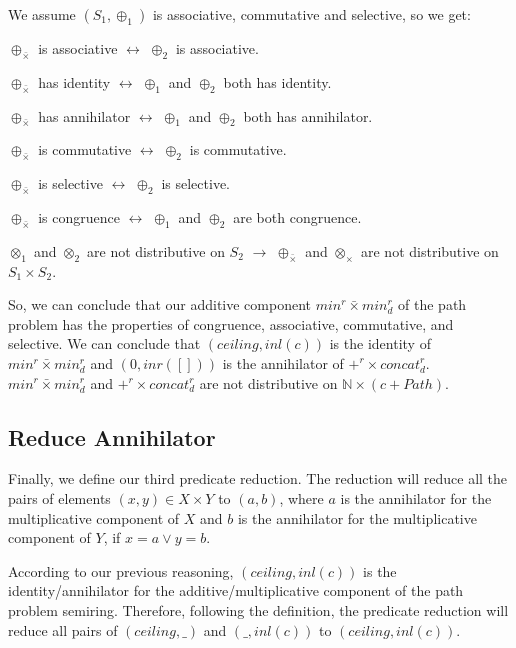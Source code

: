 \documentclass[a4paper,12pt,twoside,openright]{report}
\begin{document}
We assume $(S_1,\oplus_1)$ is associative, commutative and selective, so we get:

\begin{center}
$\oplus_{\bar{\times}}$ is associative $\longleftrightarrow$ $\oplus_2$ is associative.

$\oplus_{\bar{\times}}$ has identity $\longleftrightarrow$ $\oplus_1$ and $\oplus_2$ both has identity.

$\oplus_{\bar{\times}}$ has annihilator $\longleftrightarrow$ $\oplus_1$ and $\oplus_2$ both has annihilator.

$\oplus_{\bar{\times}}$ is commutative $\longleftrightarrow$ $\oplus_2$ is commutative.

$\oplus_{\bar{\times}}$ is selective $\longleftrightarrow$ $\oplus_2$ is selective.

$\oplus_{\bar{\times}}$ is congruence $\longleftrightarrow$ $\oplus_1$ and $\oplus_2$ are both congruence.

$\otimes_1$ and $\otimes_2$ are not distributive on $S_2$ $\longrightarrow$ $\oplus_{\bar{\times}}$ and $\otimes_\times$ are not distributive on $S_1 \times S_2$.

\end{center}


So, we can conclude that our additive component $min^r \bar{\times} min^r_d$ of the path problem has the properties of congruence, associative, commutative, and selective. We can conclude that $(ceiling,inl(c))$ is the identity of $min^r \bar{\times} min^r_d$ and $(0,inr([]))$ is the annihilator of $+^r \times concat^r_d$. $min^r \bar{\times} min^r_d$ and $+^r \times concat^r_d$ are not distributive on $\mathbb{N} \times (c + Path)$.
\subsection{Reduce Annihilator}
Finally, we define our third predicate reduction. The reduction will reduce all the pairs of elements $(x,y) \in X \times Y$ to $(a,b)$, where $a$ is the annihilator for the multiplicative component of $X$ and $b$ is the annihilator for the multiplicative component of $Y$, if $x = a \vee y = b$.

According to our previous reasoning, $(ceiling,inl (c))$ is the identity/annihilator for the additive/multiplicative component of the path problem semiring. Therefore, following the definition, the predicate reduction will reduce all pairs of $(ceiling,\_)$ and $(\_,inl(c))$ to $(ceiling,inl(c))$.
\end{document}
